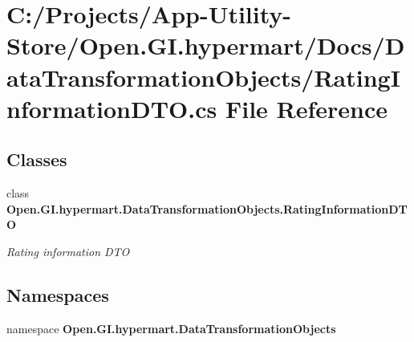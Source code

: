 \section{C\+:/\+Projects/\+App-\/\+Utility-\/\+Store/\+Open.G\+I.\+hypermart/\+Docs/\+Data\+Transformation\+Objects/\+Rating\+Information\+D\+TO.cs File Reference}
\label{_rating_information_d_t_o_8cs}
\subsection*{Classes}
\begin{DoxyCompactItemize}
\item 
class \textbf{ Open.\+G\+I.\+hypermart.\+Data\+Transformation\+Objects.\+Rating\+Information\+D\+TO}
\begin{DoxyCompactList}\small\item\em Rating information D\+TO \end{DoxyCompactList}\end{DoxyCompactItemize}
\subsection*{Namespaces}
\begin{DoxyCompactItemize}
\item 
namespace \textbf{ Open.\+G\+I.\+hypermart.\+Data\+Transformation\+Objects}
\end{DoxyCompactItemize}
